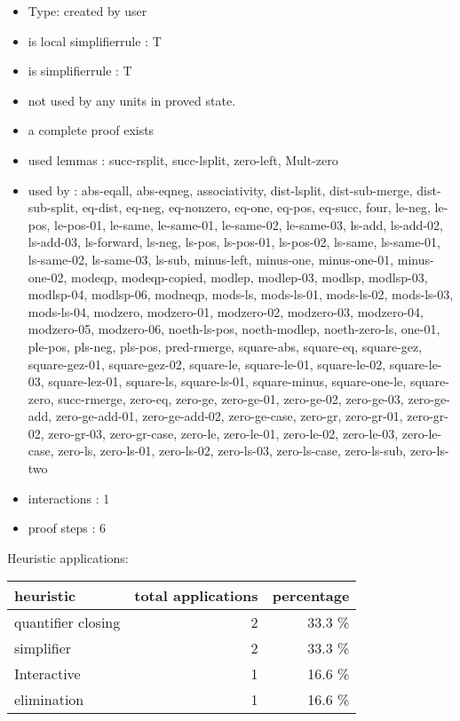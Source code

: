 \documentclass[a4paper]{article}
\begin{document}
\begin{itemize}

\item Type: created by user

\item is local simplifierrule : T
\item is simplifierrule : T
\item not used by any units in proved state.
\item       a complete proof exists
\item       used lemmas  : succ-rsplit, succ-lsplit, zero-left, Mult-zero
\item       used by      : abs-eqall, abs-eqneg, associativity, dist-lsplit, dist-sub-merge, dist-sub-split, eq-dist, eq-neg, eq-nonzero, eq-one, eq-pos, eq-succ, four, le-neg, le-pos, le-pos-01, le-same, le-same-01, le-same-02, le-same-03, ls-add, ls-add-02, ls-add-03, ls-forward, ls-neg, ls-pos, ls-pos-01, ls-pos-02, ls-same, ls-same-01, ls-same-02, ls-same-03, ls-sub, minus-left, minus-one, minus-one-01, minus-one-02, modeqp, modeqp-copied, modlep, modlep-03, modlsp, modlsp-03, modlsp-04, modlsp-06, modneqp, mods-ls, mods-ls-01, mods-ls-02, mods-ls-03, mods-ls-04, modzero, modzero-01, modzero-02, modzero-03, modzero-04, modzero-05, modzero-06, noeth-ls-pos, noeth-modlep, noeth-zero-ls, one-01, ple-pos, pls-neg, pls-pos, pred-rmerge, square-abs, square-eq, square-gez, square-gez-01, square-gez-02, square-le, square-le-01, square-le-02, square-le-03, square-lez-01, square-ls, square-ls-01, square-minus, square-one-le, square-zero, succ-rmerge, zero-eq, zero-ge, zero-ge-01, zero-ge-02, zero-ge-03, zero-ge-add, zero-ge-add-01, zero-ge-add-02, zero-ge-case, zero-gr, zero-gr-01, zero-gr-02, zero-gr-03, zero-gr-case, zero-le, zero-le-01, zero-le-02, zero-le-03, zero-le-case, zero-ls, zero-ls-01, zero-ls-02, zero-ls-03, zero-ls-case, zero-ls-sub, zero-ls-two
\item       interactions : 1
\item       proof steps  : 6
\end{itemize}

\medskip


Heuristic applications:

\begin{supertabular}{l|r|r}
heuristic	& total applications & percentage \\ \hline
quantifier closing & 2 & 33.3 \% \\
simplifier & 2 & 33.3 \% \\
Interactive & 1 & 16.6 \% \\
elimination & 1 & 16.6 \% \\

\end{supertabular}
\end{document}
